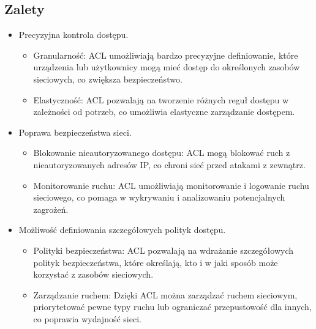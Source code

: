 \subsection{Zalety}
\begin{itemize}
    \item Precyzyjna kontrola dostępu.
    \begin{itemize}
        \item Granularność: ACL umożliwiają bardzo precyzyjne definiowanie, które urządzenia lub użytkownicy mogą mieć dostęp do określonych zasobów sieciowych, co zwiększa bezpieczeństwo.
        \item Elastyczność: ACL pozwalają na tworzenie różnych reguł dostępu w zależności od potrzeb, co umożliwia elastyczne zarządzanie dostępem.
    \end{itemize}
    \item Poprawa bezpieczeństwa sieci.
    \begin{itemize}
        \item Blokowanie nieautoryzowanego dostępu: ACL mogą blokować ruch z nieautoryzowanych adresów IP, co chroni sieć przed atakami z zewnątrz.
        \item Monitorowanie ruchu: ACL umożliwiają monitorowanie i logowanie ruchu sieciowego, co pomaga w wykrywaniu i analizowaniu potencjalnych zagrożeń.
    \end{itemize}
    \item Możliwość definiowania szczegółowych polityk dostępu.
    \begin{itemize}
        \item Polityki bezpieczeństwa: ACL pozwalają na wdrażanie szczegółowych polityk bezpieczeństwa, które określają, kto i w jaki sposób może korzystać z zasobów sieciowych.
        \item Zarządzanie ruchem: Dzięki ACL można zarządzać ruchem sieciowym, priorytetować pewne typy ruchu lub ograniczać przepustowość dla innych, co poprawia wydajność sieci.
    \end{itemize}
\end{itemize}

